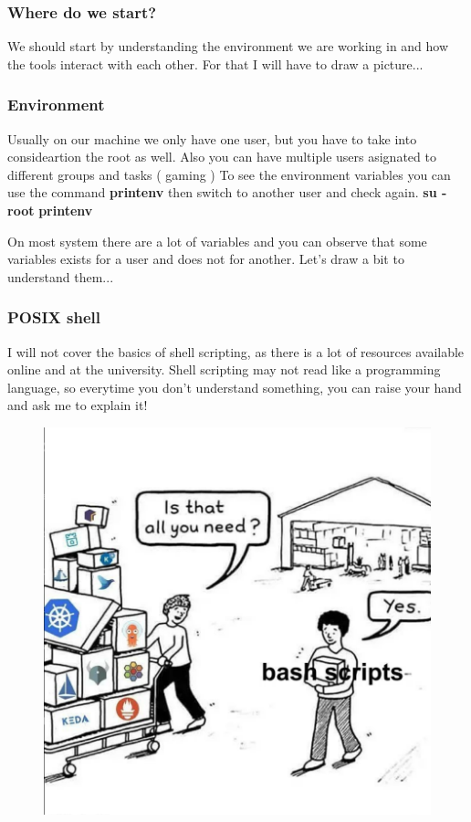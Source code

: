 \documentclass{beamer}
\begin{document}
\begin{frame}
    \frametitle {Where do we start?}
    \small
    We should start by understanding the environment we are working in and how
    the tools interact with each other. \newline \newline
    For that I will have to draw a picture...
\end{frame}

\begin{frame}
    \frametitle{Environment}
    \small Usually on our machine we only have one user, but you have to
    take into consideartion the root as well. Also you can have multiple users
    asignated to different groups and tasks ( gaming )
    \newline
    \newline
    To see the environment variables you can use the command\newline
    \textbf{printenv} \newline
    then switch to another user and check again.\newline
    \textbf{su - root} \newline
    \textbf{printenv} \newline

    On most system there are a lot of variables and you can observe that
    some variables exists for a user and does not for another. \newline
    \newline
    Let's draw a bit to understand them...
\end{frame}


\begin{frame}
\frametitle{POSIX shell}
\small
I will not cover the basics of shell scripting, as there is a lot of resources available online and at the university.
    \newline \newline
Shell scripting may not read like a programming language, so everytime you
don't understand something, you can raise your hand and ask me to explain it!
    \begin{figure}
        \includegraphics[width=0.4\linewidth] {bashgod}
        \label{fig:bashgod}
    \end{figure}

\end{frame}
\end{document}
